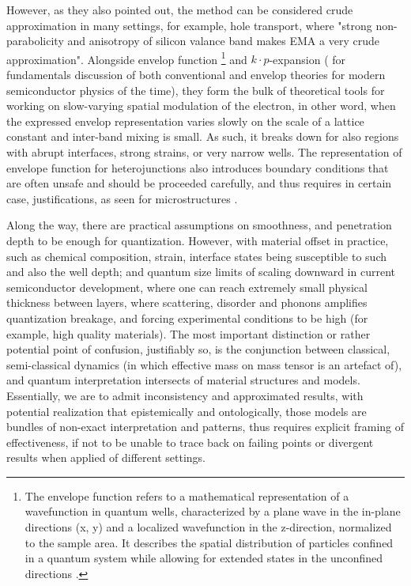 \documentclass[%
 reprint,
 amsmath,amssymb,
 aps,
]{revtex4-2}
\begin{document}
However, as they also pointed out, the method can be considered crude approximation in many settings, for example, hole transport, where "strong non-parabolicity and anisotropy of silicon valance band makes EMA a very crude approximation". Alongside envelop function \footnote{The envelope function refers to a mathematical representation of a wavefunction in quantum wells, characterized by a plane wave in the in-plane directions (x, y) and a localized wavefunction in the z-direction, normalized to the sample area. It describes the spatial distribution of particles confined in a quantum system while allowing for extended states in the unconfined directions \cite{EnvelopeFunctionOverview}.} and $k\cdot p$-expansion \cite{Li_2014} (\cite{M_G_Burt_1999} for fundamentals discussion of both conventional and envelop theories for modern semiconductor physics of the time), they form the bulk of theoretical tools for working on slow-varying spatial modulation of the electron, in other word, when the expressed envelop representation varies slowly on the scale of a lattice constant and inter-band mixing is small. As such, it breaks down for also regions with abrupt interfaces, strong strains, or very narrow wells. The representation of envelope function for heterojunctions also introduces boundary conditions that are often unsafe and should be proceeded carefully, and thus requires in certain case, justifications, as seen for microstructures \cite{Burt1992TheJF}. 

Along the way, there are practical assumptions on smoothness, and penetration depth to be enough for quantization. However, with material offset in practice, such as chemical composition, strain, interface states being susceptible to such and also the well depth; and quantum size limits of scaling downward in current semiconductor development, where one can reach extremely small physical thickness between layers, where scattering, disorder and phonons amplifies quantization breakage, and forcing experimental conditions to be high (for example, high quality materials). The most important distinction or rather potential point of confusion, justifiably so, is the conjunction between classical, semi-classical dynamics (in which effective mass on mass tensor is an artefact of), and quantum interpretation intersects of material structures and models. Essentially, we are to admit inconsistency and approximated results, with potential realization that epistemically and ontologically, those models are bundles of non-exact interpretation and patterns, thus requires explicit framing of effectiveness, if not to be unable to trace back on failing points or divergent results when applied of different settings. 
\end{document}
